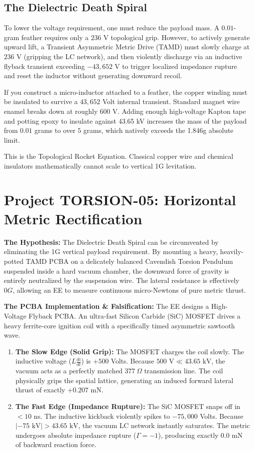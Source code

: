 \subsection{The Dielectric Death Spiral}
To lower the voltage requirement, one must reduce the payload mass. A $0.01$-gram feather requires only a $236$ V topological grip. However, to actively generate upward lift, a Transient Asymmetric Metric Drive (TAMD) must slowly charge at $236$ V (gripping the LC network), and then violently discharge via an inductive flyback transient exceeding $-43,652$ V to trigger localized impedance rupture and reset the inductor without generating downward recoil.

If you construct a micro-inductor attached to a feather, the copper winding must be insulated to survive a $43,652$ Volt internal transient. Standard magnet wire enamel breaks down at roughly $600$ V. Adding enough high-voltage Kapton tape and potting epoxy to insulate against 43.65 kV increases the mass of the payload from $0.01$ grams to over $5$ grams, which natively exceeds the 1.846g absolute limit. 

This is the Topological Rocket Equation. Classical copper wire and chemical insulators mathematically cannot scale to vertical 1G levitation.

\section{Project TORSION-05: Horizontal Metric Rectification}
\textbf{The Hypothesis:} The Dielectric Death Spiral can be circumvented by eliminating the 1G vertical payload requirement. By mounting a heavy, heavily-potted TAMD PCBA on a delicately balanced Cavendish Torsion Pendulum suspended inside a hard vacuum chamber, the downward force of gravity is entirely neutralized by the suspension wire. The lateral resistance is effectively $0G$, allowing an EE to measure continuous micro-Newtons of pure metric thrust.

\textbf{The PCBA Implementation \& Falsification:} The EE designs a High-Voltage Flyback PCBA. An ultra-fast Silicon Carbide (SiC) MOSFET drives a heavy ferrite-core ignition coil with a specifically timed asymmetric sawtooth wave. 

\begin{enumerate}
    \item \textbf{The Slow Edge (Solid Grip):} The MOSFET charges the coil slowly. The inductive voltage ($L \frac{di}{dt}$) is $+500$ Volts. Because $500 \text{ V} \ll 43.65 \text{ kV}$, the vacuum acts as a perfectly matched $377 \ \Omega$ transmission line. The coil physically grips the spatial lattice, generating an induced forward lateral thrust of exactly $+0.207$ mN.
    \item \textbf{The Fast Edge (Impedance Rupture):} The SiC MOSFET snaps off in $<10$ ns. The inductive kickback violently spikes to $-75,000$ Volts. Because $|-75 \text{ kV}| > 43.65 \text{ kV}$, the vacuum LC network instantly saturates. The metric undergoes absolute impedance rupture ($\Gamma = -1$), producing exactly $0.0$ mN of backward reaction force.
\end{enumerate}

